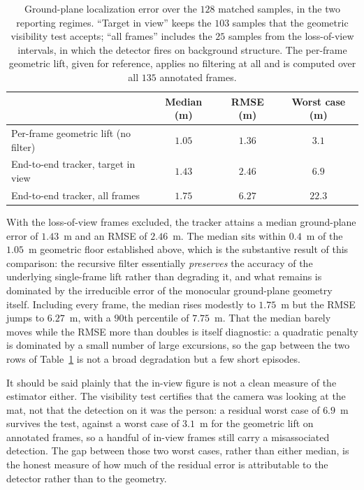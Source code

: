 \begin{table}[H]
  \centering
  \caption{Ground-plane localization error over the $128$ matched samples, in the
  two reporting regimes. ``Target in view'' keeps the $103$ samples that the
  geometric visibility test accepts; ``all frames'' includes the $25$ samples from
  the loss-of-view intervals, in which the detector fires on background structure.
  The per-frame geometric lift, given for reference, applies no filtering at all and
  is computed over all $135$ annotated frames.}
  \label{tab:mono_accuracy}
  \begin{tabular}{@{}lccc@{}}
    \toprule
    & Median (m) & RMSE (m) & Worst case (m) \\
    \midrule
    Per-frame geometric lift (no filter) & $1.05$ & $1.36$ & $3.1$ \\
    End-to-end tracker, target in view   & $1.43$ & $2.46$ & $6.9$ \\
    End-to-end tracker, all frames       & $1.75$ & $6.27$ & $22.3$ \\
    \bottomrule
  \end{tabular}
\end{table}

With the loss-of-view frames excluded, the tracker attains a median ground-plane
error of $1.43$~m and an RMSE of $2.46$~m. The median sits within $0.4$~m of the
$1.05$~m geometric floor established above, which is the substantive result of
this comparison: the recursive filter essentially \emph{preserves} the accuracy of
the underlying single-frame lift rather than degrading it, and what remains is
dominated by the irreducible error of the monocular ground-plane geometry itself.
Including every frame, the median rises modestly to $1.75$~m but the RMSE jumps to
$6.27$~m, with a $90$th percentile of $7.75$~m. That the median barely moves while
the RMSE more than doubles is itself diagnostic: a quadratic penalty is dominated
by a small number of large excursions, so the gap between the two rows of
Table~\ref{tab:mono_accuracy} is not a broad degradation but a few short episodes.

It should be said plainly that the in-view figure is not a clean measure of the
estimator either. The visibility test certifies that the camera was looking at the
mat, not that the detection on it was the person: a residual worst case of $6.9$~m
survives the test, against a worst case of $3.1$~m for the geometric lift on
annotated frames, so a handful of in-view frames still carry a misassociated
detection. The gap between those two worst cases, rather than either median, is the
honest measure of how much of the residual error is attributable to the detector
rather than to the geometry.

